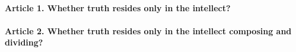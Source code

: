 \documentclass{ucetd}
\begin{document}
\paragraph{Article 1. Whether truth resides only in the intellect?}
\paragraph{Article 2. Whether truth resides only in the intellect composing and dividing?}
\end{document}
